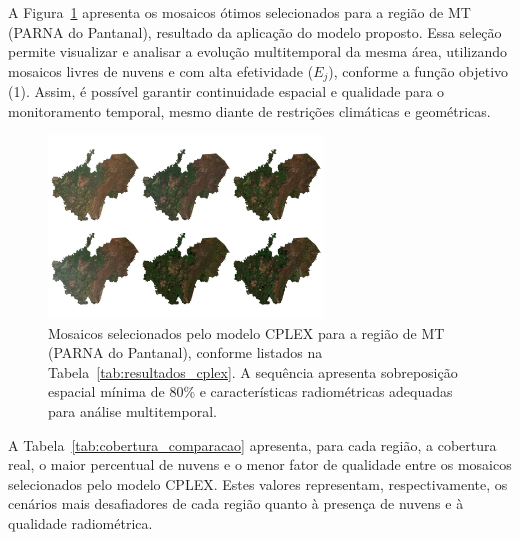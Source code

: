\documentclass[a4paper,11pt]{article}
\begin{document}
A Figura~\ref{fig:intersecoes} apresenta os mosaicos ótimos selecionados para a região de MT (PARNA do Pantanal), resultado da aplicação do modelo proposto. Essa seleção permite visualizar e analisar a evolução multitemporal da mesma área, utilizando mosaicos livres de nuvens e com alta efetividade ($E_j$), conforme a função objetivo (1). Assim, é possível garantir continuidade espacial e qualidade para o monitoramento temporal, mesmo diante de restrições climáticas e geométricas.

\begin{figure}[H]
    \centering
    \includegraphics[width=0.65\textwidth]{./img/mosaic_mg_plot.jpg}
    \caption{Mosaicos selecionados pelo modelo CPLEX para a região de MT (PARNA do Pantanal), conforme listados na Tabela~\ref{tab:resultados_cplex}. A sequência apresenta sobreposição espacial mínima de 80\% e características radiométricas adequadas para análise multitemporal.}
    \label{fig:intersecoes}
\end{figure}

\vspace{-5mm}

A Tabela~\ref{tab:cobertura_comparacao} apresenta, para cada região, a cobertura real, o maior percentual de nuvens e o menor fator de qualidade entre os mosaicos selecionados pelo modelo CPLEX. Estes valores representam, respectivamente, os cenários mais desafiadores de cada região quanto à presença de nuvens e à qualidade radiométrica.
\end{document}
